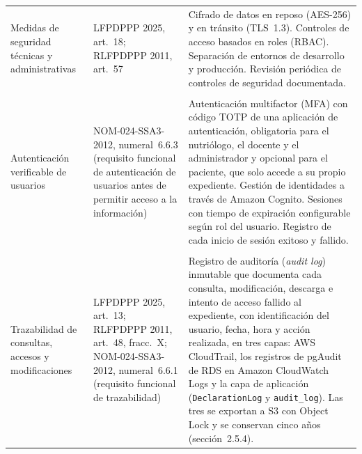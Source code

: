 \documentclass[12pt, a4paper]{article}
\begin{document}
\begin{longtable}{>{\raggedright\arraybackslash}p{2.8cm}
  >{\raggedright\arraybackslash}p{3.0cm}
  >{\raggedright\arraybackslash}p{8.5cm}}
  Medidas de seguridad técnicas y administrativas
    & LFPDPPP 2025, art.~18; RLFPDPPP 2011, art.~57
    & Cifrado de datos en reposo (AES-256) y en tránsito
      (TLS~1.3). Controles de acceso basados
      en roles (RBAC). Separación de entornos de desarrollo
      y producción. Revisión periódica de controles de
      seguridad documentada. \\
  \\[4pt]

  Autenticación verificable de usuarios
    & NOM-024-SSA3-2012, numeral~6.6.3 (requisito funcional de autenticación
      de usuarios antes de permitir acceso a la información)
    & Autenticación multifactor (MFA) con código TOTP de una
      aplicación de autenticación, obligatoria para el nutriólogo, el
      docente y el administrador y opcional para el paciente, que solo
      accede a su propio expediente. Gestión de identidades a través de Amazon
      Cognito. Sesiones con tiempo de expiración configurable
      según rol del usuario. Registro de cada inicio de sesión
      exitoso y fallido. \\
  \\[4pt]

  Trazabilidad de consultas, accesos y modificaciones
    & LFPDPPP 2025, art.~13; RLFPDPPP 2011, art.~48, fracc.~X; NOM-024-SSA3-2012, numeral~6.6.1 (requisito funcional de trazabilidad)
    & Registro de auditoría (\textit{audit log}) inmutable que documenta
      cada consulta, modificación, descarga e intento de acceso
      fallido al expediente, con identificación del usuario,
      fecha, hora y acción realizada, en tres capas: AWS
       CloudTrail, los registros de pgAudit de RDS en Amazon CloudWatch Logs y la
      capa de aplicación (\texttt{DeclarationLog} y \texttt{audit\_log}). Las tres se
      exportan a S3 con Object Lock y se conservan cinco años
      (sección~2.5.4). \\

\end{longtable}
\end{document}
